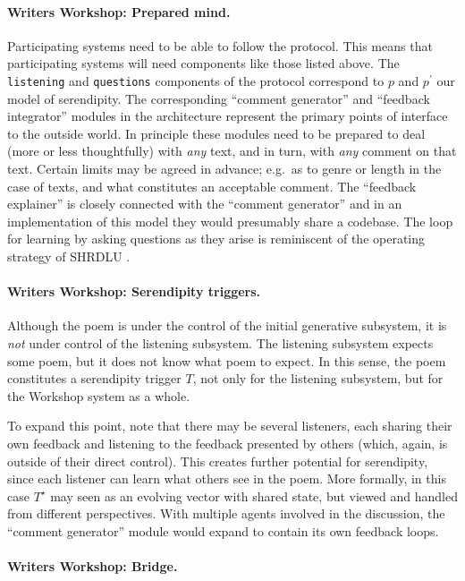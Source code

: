 \paragraph{Writers Workshop: Prepared mind.}
Participating systems need to be able to follow the protocol.  This
means that participating systems will need components like those
listed above. The {\tt listening} and {\tt questions} components of
the protocol correspond to $p$ and $p^{\prime}$ our model of
serendipity.  The corresponding ``comment generator'' and ``feedback
integrator'' modules in the architecture represent the primary points
of interface to the outside world.  In principle these modules need to
be prepared to deal (more or less thoughtfully) with \emph{any} text,
and in turn, with \emph{any} comment on that text.  Certain limits may
be agreed in advance; e.g.~as to genre or length in the case of texts,
and what constitutes an acceptable comment.  The ``feedback
explainer'' is closely connected with the ``comment generator'' and in
an implementation of this model they would presumably share a
codebase.  The loop for learning by asking questions as they arise is
reminiscent of the operating strategy of {\sf SHRDLU}
\cite{winograd1972understanding}.

\paragraph{Writers Workshop: Serendipity triggers.}

Although the poem is under the control of the initial generative
subsystem, it is \emph{not} under control of the listening subsystem.
The listening subsystem expects some poem, but it does not know what
poem to expect.  In this sense, the poem constitutes a serendipity
trigger $T$, not only for the listening subsystem, but for the
Workshop system as a whole.

To expand this point, note that there may be several listeners, each
sharing their own feedback and listening to the feedback presented by
others (which, again, is outside of their direct control).  This
creates further potential for serendipity, since each listener can
learn what others see in the poem.  More formally, in this case
$T^\star$ may seen as an evolving vector with shared state, but viewed
and handled from different perspectives.  With multiple agents
involved in the discussion, the ``comment generator'' module would
expand to contain its own feedback loops.

\paragraph{Writers Workshop: Bridge.}

